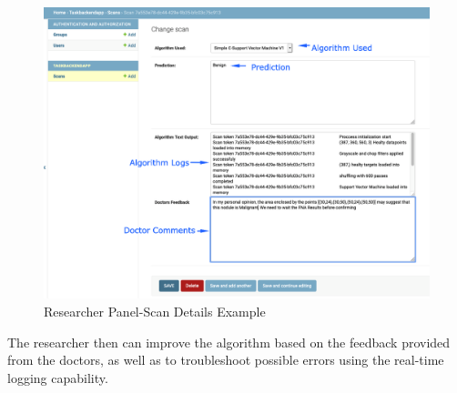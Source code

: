			\begin{figure}[H]
				\iftrue
				\caption{Researcher Panel-Scan Details Example}
				\centering
				\includegraphics[scale=0.3]{figures/research-panel-scan-view}
				\fi
			\end{figure}
			The researcher then can improve the algorithm based on the feedback provided from the doctors, as well as to troubleshoot
			possible errors using the real-time logging capability.
			
			
			
			
		
		
		
			
			
			
			
			
		
	



